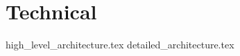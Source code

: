 \chapter{Technical}
\label{chap:technical}

{high_level_architecture.tex}
{detailed_architecture.tex}

